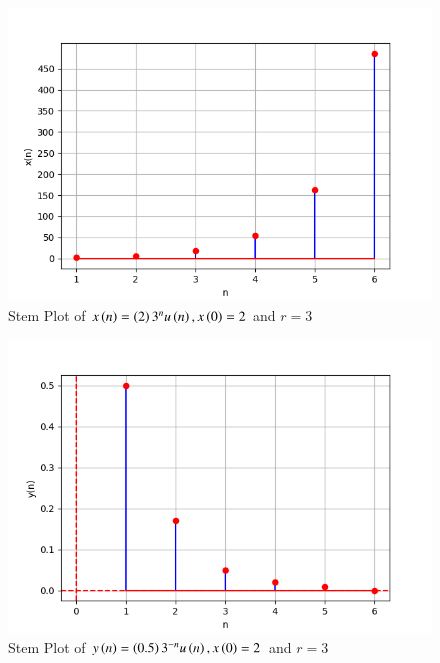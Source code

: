 \documentclass[journal,12pt,twocolumn]{IEEEtran}
\begin{document}
\begin{figure}[ht]
   \centering
   \includegraphics[width=1\columnwidth]{figs/plot2.png}
   \caption{Stem Plot of $x\left(n\right) = \left(2\right)3^{n}u\left(n\right) , x\left(0\right) = 2$ and $r = 3$}
   \label{fig: 1.11.9.1.1}
\end{figure}

\begin{figure}[ht]
   \centering
   \includegraphics[width=1\columnwidth]{figs/plot3.png}
   \caption{Stem Plot of $y\left(n\right) = \left(0.5\right)3^{-n}u\left(n\right) , x\left(0\right) = 2$ and $r = 3$}
   \label{fig: 1.11.9.1.1}
\end{figure}
\end{document}
